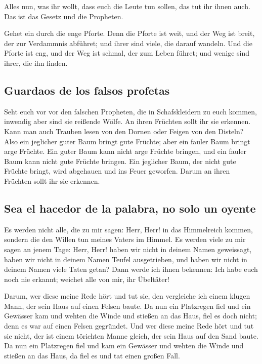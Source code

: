  Alles nun, was ihr wollt, dass euch die Leute tun
sollen, das tut ihr ihnen auch. Das ist das Gesetz und die Propheten.

 Gehet ein durch die enge Pforte. Denn die Pforte ist
weit, und der Weg ist breit, der zur Verdammnis abführet; und ihrer sind
viele, die darauf wandeln.  Und die Pforte ist eng, und
der Weg ist schmal, der zum Leben führet; und wenige sind ihrer, die ihn
finden.

\hypertarget{guardaos-de-los-falsos-profetas}{%
\subsection{Guardaos de los falsos
profetas}\label{guardaos-de-los-falsos-profetas}}

 Seht euch vor vor den falschen Propheten, die in
Schafskleidern zu euch kommen, inwendig aber sind sie reißende Wölfe.
 An ihren Früchten sollt ihr sie erkennen. Kann man auch
Trauben lesen von den Dornen oder Feigen von den Disteln?
 Also ein jeglicher guter Baum bringt gute Früchte; aber
ein fauler Baum bringt arge Früchte.  Ein guter Baum kann
nicht arge Früchte bringen, und ein fauler Baum kann nicht gute Früchte
bringen.  Ein jeglicher Baum, der nicht gute Früchte
bringt, wird abgehauen und ins Feuer geworfen.  Darum an
ihren Früchten sollt ihr sie erkennen.

\hypertarget{sea-el-hacedor-de-la-palabra-no-solo-un-oyente}{%
\subsection{Sea el hacedor de la palabra, no solo un
oyente}\label{sea-el-hacedor-de-la-palabra-no-solo-un-oyente}}

 Es werden nicht alle, die zu mir sagen: Herr, Herr! in
das Himmelreich kommen, sondern die den Willen tun meines Vaters im
Himmel.  Es werden viele zu mir sagen an jenem Tage:
Herr, Herr! haben wir nicht in deinem Namen geweissagt, haben wir nicht
in deinem Namen Teufel ausgetrieben, und haben wir nicht in deinem Namen
viele Taten getan?  Dann werde ich ihnen bekennen: Ich
habe euch noch nie erkannt; weichet alle von mir, ihr Übeltäter!

 Darum, wer diese meine Rede hört und tut sie, den
vergleiche ich einem klugen Mann, der sein Haus auf einen Felsen baute.
 Da nun ein Platzregen fiel und ein Gewässer kam und
wehten die Winde und stießen an das Haus, fiel es doch nicht; denn es
war auf einen Felsen gegründet.  Und wer diese meine Rede
hört und tut sie nicht, der ist einem törichten Manne gleich, der sein
Haus auf den Sand baute.  Da nun ein Platzregen fiel und
kam ein Gewässer und wehten die Winde und stießen an das Haus, da fiel
es und tat einen großen Fall.

